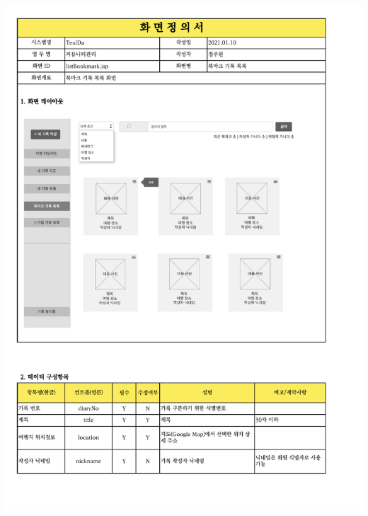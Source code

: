 {{{{{{{{{{{{{{{{{{{{\includegraphics[width=20cm]{./Figure/Analysis/Display/diary/diary_19.pdf} \\
}}}}}}}}}}}}}}}}}}}}
